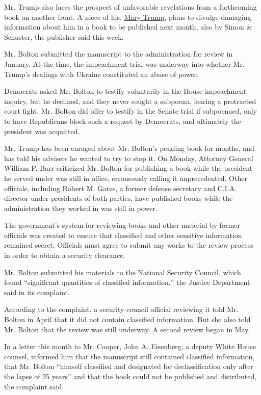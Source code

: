 Mr. Trump also faces the prospect of unfavorable revelations from a
forthcoming book on another front. A niece of his,
\href{https://www.nytimes.com/2020/07/03/us/politics/mary-trump-book-publication.html}{Mary
Trump}, plans to divulge damaging information about him in a book to be
published next month, also by Simon \& Schuster, the publisher said this
week.

Mr. Bolton submitted the manuscript to the administration for review in
January. At the time, the impeachment trial was underway into whether
Mr. Trump's dealings with Ukraine constituted an abuse of power.

Democrats asked Mr. Bolton to testify voluntarily in the House
impeachment inquiry, but he declined, and they never sought a subpoena,
fearing a protracted court fight. Mr. Bolton did offer to testify in the
Senate trial if subpoenaed, only to have Republicans block such a
request by Democrats, and ultimately the president was acquitted.

Mr. Trump has been enraged about Mr. Bolton's pending book for months,
and has told his advisers he wanted to try to stop it. On Monday,
Attorney General William P. Barr criticized Mr. Bolton for publishing a
book while the president he served under was still in office,
erroneously calling it unprecedented. Other officials, including Robert
M. Gates, a former defense secretary and C.I.A. director under
presidents of both parties, have published books while the
administration they worked in was still in power.

The government's system for reviewing books and other material by former
officials was created to ensure that classified and other sensitive
information remained secret. Officials must agree to submit any works to
the review process in order to obtain a security clearance.

Mr. Bolton submitted his materials to the National Security Council,
which found ``significant quantities of classified information,'' the
Justice Department said in its complaint.

According to the complaint, a security council official reviewing it
told Mr. Bolton in April that it did not contain classified information.
But she also told Mr. Bolton that the review was still underway. A
second review began in May.

In a letter this month to Mr. Cooper, John A. Eisenberg, a deputy White
House counsel, informed him that the manuscript still contained
classified information, that Mr. Bolton ``himself classified and
designated for declassification only after the lapse of 25 years'' and
that the book could not be published and distributed, the complaint
said.

